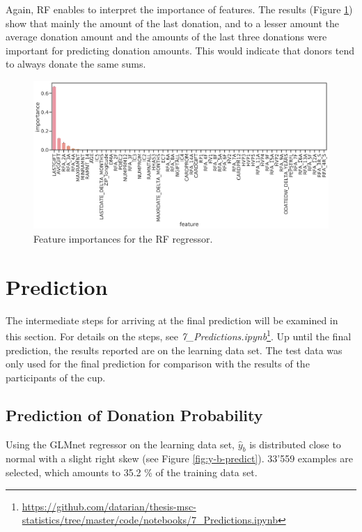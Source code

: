 \documentclass[
  11pt,
  a4paper,
  DIV=12,captions=tableheading,oneside,titlepage]{scrbook}
\begin{document}
Again, RF enables to interpret the importance of features. The results (Figure \ref{fig:reg-importance}) show that mainly the amount of the last donation, and to a lesser amount the average donation amount and the amounts of the last three donations were important for predicting donation amounts. This would indicate that donors tend to always donate the same sums.



\begin{figure}

{\centering \includegraphics[width=0.7\linewidth]{figures/learning/feature-importance-rf-regression} 

}

\caption{Feature importances for the RF regressor.}\label{fig:reg-importance}
\end{figure}

\hypertarget{prediction}{%
\section{Prediction}\label{prediction}}

The intermediate steps for arriving at the final prediction will be examined in this section. For details on the steps, see \emph{7\_Predictions.ipynb}\footnote{\url{https://github.com/datarian/thesis-msc-statistics/tree/master/code/notebooks/7_Predictions.ipynb}}. Up until the final prediction, the results reported are on the learning data set. The test data was only used for the final prediction for comparison with the results of the participants of the cup.

\hypertarget{prediction-of-donation-probability}{%
\subsection{Prediction of Donation Probability}\label{prediction-of-donation-probability}}

Using the GLMnet regressor on the learning data set, \(\hat{y}_b\) is distributed close to normal with a slight right skew (see Figure \ref{fig:y-b-predict}). 33'559 examples are selected, which amounts to 35.2 \% of the training data set.
\end{document}
